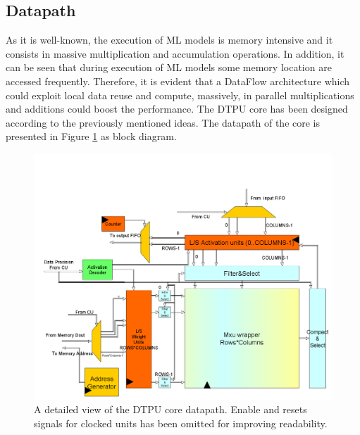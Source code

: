 \subsection{Datapath}
As it is well-known, the execution of ML models is memory intensive and it consists in massive multiplication and accumulation operations. In addition, it can be seen that during execution of ML models some memory location are accessed frequently. Therefore, it is evident that a DataFlow architecture which could exploit local data reuse and compute, massively, in parallel multiplications and additions could boost the performance.
The DTPU core has been designed according to the previously mentioned ideas.
The datapath of the core is presented in Figure \ref{fig:datapath} as block diagram.
\begin{figure}[H]
\centering
\captionsetup{justification=centering}
\includegraphics[scale=0.3,angle=0]{./figure/datapath_dtpu_core.png}
\caption{A detailed view of the DTPU core datapath. Enable and resets signals for clocked units has been omitted for improving readability. }
\label{fig:datapath}
\end{figure} 

